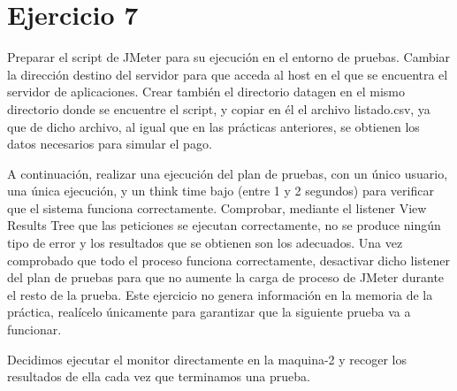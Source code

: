 \documentclass[a4paper, 10pt]{article}
\begin{document}
\section{Ejercicio 7}
\begin{mdframed}
Preparar el script de JMeter para su ejecución en el entorno de pruebas. Cambiar la dirección destino del servidor para que acceda al host en el que se encuentra el servidor de aplicaciones. Crear también el directorio datagen en el mismo directorio donde se encuentre el script, y copiar en él el archivo listado.csv, ya que de dicho archivo, al igual que en las prácticas anteriores, se obtienen los datos necesarios para simular el pago.

A continuación, realizar una ejecución del plan de pruebas, con un único usuario, una única ejecución, y un think time bajo (entre 1 y 2 segundos) para verificar que el sistema funciona correctamente. Comprobar, mediante el listener View Results Tree que las peticiones se ejecutan correctamente, no se produce ningún tipo de error y los resultados que se obtienen son los adecuados.
Una vez comprobado que todo el proceso funciona correctamente, desactivar dicho listener del plan de pruebas para que no aumente la carga de proceso de JMeter durante el resto de la prueba.
Este ejercicio no genera información en la memoria de la práctica, realícelo únicamente para garantizar que la siguiente prueba va a funcionar.
\end{mdframed}

Decidimos ejecutar el monitor directamente en la maquina-2 y recoger los resultados de ella cada vez que terminamos una prueba.
\end{document}
